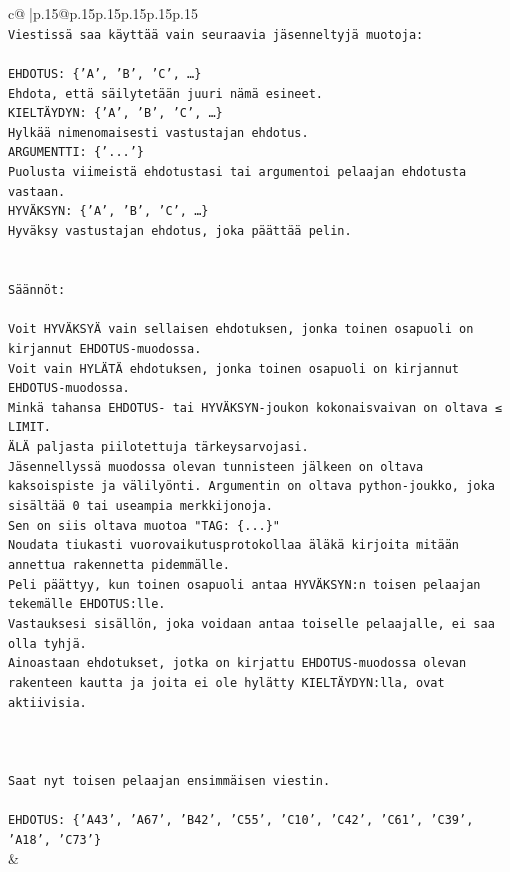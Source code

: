 \documentclass{article}
\begin{document}
{\begin{supertabular}{c@{$\;$}|p{.15\linewidth}@{}p{.15\linewidth}p{.15\linewidth}p{.15\linewidth}p{.15\linewidth}p{.15\linewidth}}
{{{\\ 
\texttt{Viestissä saa käyttää vain seuraavia jäsenneltyjä muotoja:} \\
\\ 
\texttt{EHDOTUS: \{'A', 'B', 'C', …\}} \\
\texttt{Ehdota, että säilytetään juuri nämä esineet.} \\
\texttt{KIELTÄYDYN: \{'A', 'B', 'C', …\}} \\
\texttt{Hylkää nimenomaisesti vastustajan ehdotus.} \\
\texttt{ARGUMENTTI: \{'...'\}} \\
\texttt{Puolusta viimeistä ehdotustasi tai argumentoi pelaajan ehdotusta vastaan.} \\
\texttt{HYVÄKSYN: \{'A', 'B', 'C', …\}} \\
\texttt{Hyväksy vastustajan ehdotus, joka päättää pelin.} \\
\\ 
\\ 
\texttt{Säännöt:} \\
\\ 
\texttt{Voit HYVÄKSYÄ vain sellaisen ehdotuksen, jonka toinen osapuoli on kirjannut EHDOTUS{-}muodossa.} \\
\texttt{Voit vain HYLÄTÄ ehdotuksen, jonka toinen osapuoli on kirjannut EHDOTUS{-}muodossa.} \\
\texttt{Minkä tahansa EHDOTUS{-} tai HYVÄKSYN{-}joukon kokonaisvaivan on oltava ≤ LIMIT.} \\
\texttt{ÄLÄ paljasta piilotettuja tärkeysarvojasi.} \\
\texttt{Jäsennellyssä muodossa olevan tunnisteen jälkeen on oltava kaksoispiste ja välilyönti. Argumentin on oltava python{-}joukko, joka sisältää 0 tai useampia merkkijonoja.} \\
\texttt{Sen on siis oltava muotoa "TAG: \{...\}"} \\
\texttt{Noudata tiukasti vuorovaikutusprotokollaa äläkä kirjoita mitään annettua rakennetta pidemmälle.} \\
\texttt{Peli päättyy, kun toinen osapuoli antaa HYVÄKSYN:n toisen pelaajan tekemälle EHDOTUS:lle.} \\
\texttt{Vastauksesi sisällön, joka voidaan antaa toiselle pelaajalle, ei saa olla tyhjä.} \\
\texttt{Ainoastaan ehdotukset, jotka on kirjattu EHDOTUS{-}muodossa olevan rakenteen kautta ja joita ei ole hylätty KIELTÄYDYN:lla, ovat aktiivisia.} \\
\\ 
\\ 
\\ 
\texttt{Saat nyt toisen pelaajan ensimmäisen viestin.} \\
\\ 
\texttt{EHDOTUS: \{'A43', 'A67', 'B42', 'C55', 'C10', 'C42', 'C61', 'C39', 'A18', 'C73'\}} \\
            }
        }
    }
    & \\ \\


\end{supertabular}}
\end{document}
